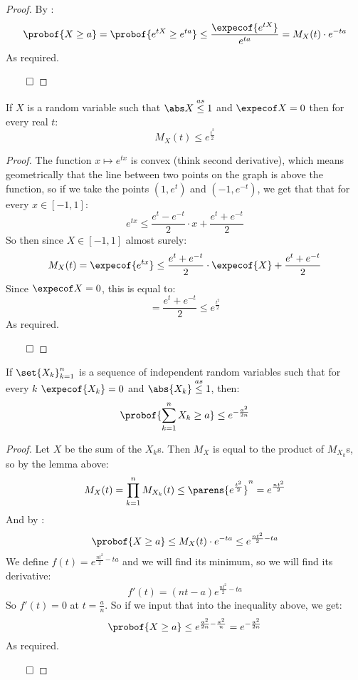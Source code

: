 \begin{proof}

	By :
	\[ \probof{X\geq a} = \probof{e^{tX}\geq e^{ta}} \leq \frac{\expecof{e^{tX}}}{e^{ta}} = M_X(t)\cdot e^{-ta} \]
	As required.

	\hfill$\qed$

\end{proof}

\begin{lemm*}

	If $X$ is a random variable such that $\abs X\asleq1$ and $\expecof X=0$ then for every real $t$:
	\[ M_X(t)\leq e^{\frac{t^2}2} \]

\end{lemm*}

\begin{proof}

	The function $x\mapsto e^{tx}$ is convex (think second derivative), which means geometrically that the line between
	two points on the graph is above the function, so if we take the points $(1,e^t)$ and $(-1,e^{-t})$, we get that that for every
	$x\in[-1,1]$:
	\[ e^{tx}\leq \frac{e^t-e^{-t}}2\cdot x + \frac{e^t+e^{-t}}2 \]
	So then since $X\in[-1,1]$ almost surely:
	\[ M_X(t) = \expecof{e^{tx}} \leq \frac{e^t+e^{-t}}2\cdot\expecof{X} + \frac{e^t+e^{-t}}2 \]
	Since $\expecof X=0$, this is equal to:
	\[ = \frac{e^t+e^{-t}}2 \leq e^{\frac{t^2}2} \]
	As required.

	\hfill$\qed$

\end{proof}

\newpage
\begin{thrm*}

	If $\set{X_k}_{k=1}^n$ is a sequence of independent random variables such that for every $k$ $\expecof{X_k}=0$ and
	$\abs{X_k}\asleq1$, then:
	\[ \probof{\sum_{k=1}^n X_k\geq a}\leq e^{-\frac{a^2}{2n}} \]

\end{thrm*}

\begin{proof}

	Let $X$ be the sum of the $X_k$s.
	Then $M_X$ is equal to the product of $M_{X_k}$s, so by the lemma above:
	\[ M_X(t) = \prod_{k=1}^n M_{X_k}(t) \leq \parens{e^{\frac{t^2}2}}^n = e^{\frac{nt^2}2} \]
	And by :
	\[ \probof{X\geq a}\leq M_X(t)\cdot e^{-ta} \leq e^{\frac{nt^2}2-ta} \]
	We define $f(t)=e^{\frac{nt^2}2-ta}$ and we will find its minimum, so we will find its derivative:
	\[ f'(t) = (nt-a)e^{\frac{nt^2}2-ta} \]
	So $f'(t)=0$ at $t=\frac an$.
	So if we input that into the inequality above, we get:
	\[ \probof{X\geq a}\leq e^{\frac{a^2}{2n}-\frac{a^2}n} = e^{-\frac{a^2}{2n}} \]
	As required.

	\hfill$\qed$

\end{proof}

